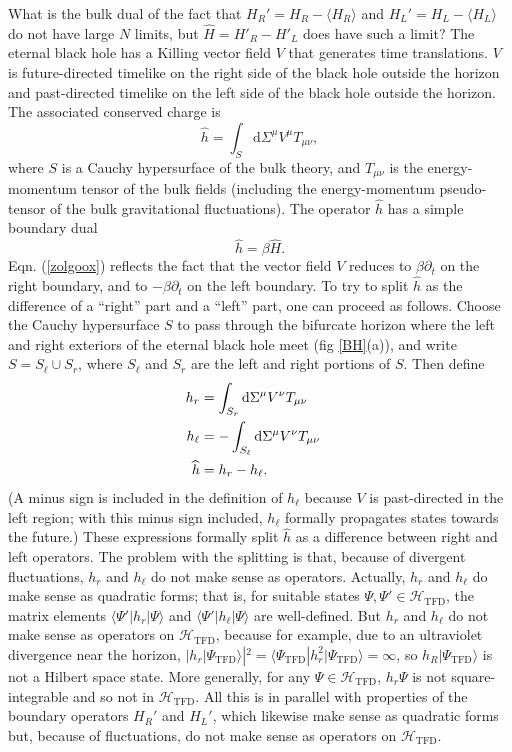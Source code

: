 \documentclass[11pt,a4paper]{article}
\def\be{\begin{equation}}
\def\ee{\end{equation}}
\def\h{\widehat}
\def\d{{\mathrm d}}
\def\h{\widehat}
\def\la{\langle}
\def\ra{\rangle}
\def\H{{\mathcal H}}
\def\TFD{{\mathrm{TFD}}}
\begin{document}
What is the bulk dual of the fact that $H_R'=H_R-\la H_R\ra$ and $H_L'=H_L-\la H_L\ra$ do not have large $N$ limits, but $\h H=H'_R-H'_L$ does
have such a limit?   The eternal black hole has a Killing vector field $V$ that generates time translations.  $V$  is future-directed timelike 
on the right side of the black hole outside the horizon
and past-directed timelike on the left side of the black hole outside the horizon.   The associated conserved charge is
\be\label{tolgo}\h h=\int_S \d\Sigma^\mu V^\mu T_{\mu\nu}, \ee
where $S$ is a Cauchy hypersurface of the bulk theory, and $T_{\mu\nu}$ is the energy-momentum tensor of the bulk fields (including the energy-momentum
pseudo-tensor of the bulk gravitational fluctuations).   The operator $\h h$ has a simple boundary dual
\be\label{zolgoox}\h h=\beta \h H. \ee
 Eqn. (\ref{zolgoox}) reflects the fact that the vector field $V$ reduces to $\beta\partial_t$
 on the right boundary, and to $-\beta\partial_t$ on the left boundary.
To try to split $\h h$ as the difference of a ``right'' part and a ``left'' part, one can proceed as follows.   Choose the Cauchy hypersurface $S$ to pass through
the bifurcate horizon where the left and right exteriors of the eternal black hole meet (fig \ref{BH}(a)), and write $S=S_\ell\cup S_r$, where $S_\ell $ and $S_r$ are the left
and right portions of $S$.   Then define
\begin{align}\label{nolgo} h_r& =\int_{ S_r}\d\Sigma^\mu V^\nu T_{\mu\nu}\cr  
                                          h_\ell& =-\int_{ S_\ell}\d\Sigma^\mu V^\nu T_{\mu\nu}\cr  
                                          \h h&=h_r-h_\ell.\end{align}
 (A minus sign is included in the definition of $h_\ell$ because $V$ is past-directed in the left region; with this minus sign included, $h_\ell$ formally propagates
 states towards the future.)    These expressions formally split $\h h$ as a difference between right and left operators.  The problem with the splitting is that, because of
 divergent fluctuations,  $h_r$ and $h_\ell$
 do not make sense as operators.      Actually,  $h_r$ and $h_\ell$ do make sense as quadratic forms; that is, for suitable states $\Psi,\Psi'\in\H_\TFD$, the
 matrix elements $\la\Psi'|h_r|\Psi\ra$ and $\la\Psi'|h_\ell|\Psi\ra$ are well-defined.   But $h_r$ and $h_\ell$ do not make sense as operators on 
 $\H_\TFD$, because for example, due to an ultraviolet divergence near the horizon, $|h_r|\Psi_\TFD\ra|^2=\la\Psi_\TFD|h_r^2|\Psi_\TFD\ra=\infty$, so $h_R|\Psi_\TFD\ra$
 is not a Hilbert space state.   More generally, for any $\Psi\in\H_\TFD$, $h_r\Psi$ is not square-integrable and so not in $\H_\TFD$.
 All this is in parallel with properties of the boundary operators $H_R'$ and $H_L'$, which likewise make sense as quadratic forms but, because of fluctuations, do
 not make sense as operators on $\H_\TFD$.                                
\end{document}
